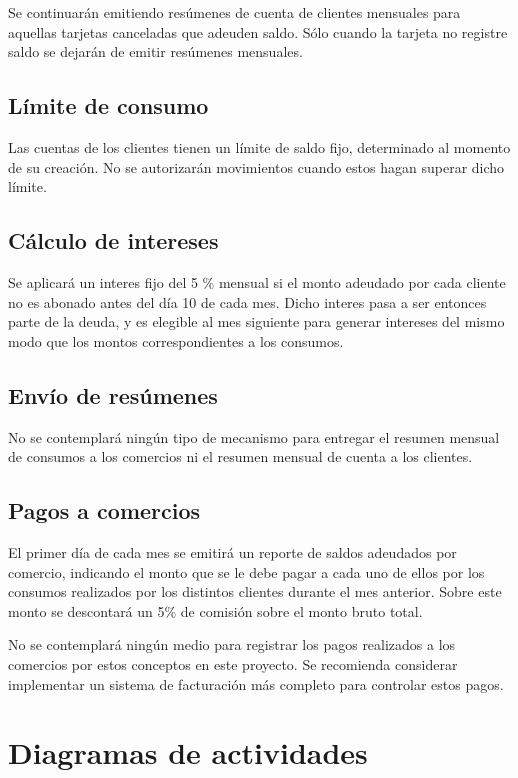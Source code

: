 Se continuarán emitiendo resúmenes de cuenta de clientes mensuales para aquellas
tarjetas canceladas que adeuden saldo. Sólo cuando la tarjeta no registre saldo
se dejarán de emitir resúmenes mensuales.

\subsection{Límite de consumo}

Las cuentas de los clientes tienen un límite de saldo fijo, determinado al momento de su creación. No se autorizarán movimientos cuando estos hagan superar dicho límite.

\subsection{Cálculo de intereses}

Se aplicará un interes fijo del 5 \% mensual si el monto adeudado por cada
cliente no es abonado antes del día 10 de cada mes. Dicho interes pasa a ser
entonces parte de la deuda, y es elegible al mes siguiente para generar
intereses del mismo modo que los montos correspondientes a los consumos.

\subsection{Envío de resúmenes}

No se contemplará ningún tipo de mecanismo para entregar el resumen mensual de
consumos a los comercios ni el resumen mensual de cuenta a los clientes.

\subsection{Pagos a comercios}

El primer día de cada mes se emitirá un reporte de saldos adeudados por
comercio, indicando el monto que se le debe pagar a cada uno de ellos por los
consumos realizados por los distintos clientes durante el mes anterior. Sobre
este monto se descontará un 5\% de comisión sobre el monto bruto total.

No se contemplará ningún medio para registrar los pagos realizados a los
comercios por estos conceptos en este proyecto. Se recomienda considerar
implementar un sistema de facturación más completo para controlar estos pagos.

\section{Diagramas de actividades}

